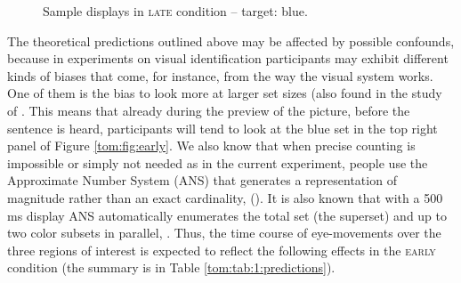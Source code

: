 \documentclass[output=paper]{langscibook}
\begin{document}
\begin{figure} 
\caption{Sample displays in \textsc{late} condition – target: blue.}
    \label{tom:fig:late}
\end{figure}



The theoretical predictions outlined above may be affected by possible confounds, because in experiments on visual
identification participants may exhibit different kinds of biases that come, for instance, from the way the visual
system works. One of them is the bias to look more at larger set sizes (also found in the study of \citet{degen2016availability}. This means that already during the preview of the picture, before the sentence is heard, participants will tend
to look at the blue set in the top right panel of Figure \ref{tom:fig:early}. We also know that when precise counting is impossible or simply not needed as in
the current experiment, people use the Approximate Number System (ANS) that generates a representation of magnitude
rather than an exact cardinality, (\citealt{feigenson2004core, dehaene2009origins, dehaene2011number}). It is also known that with a 500\,ms display
ANS automatically enumerates the total set (the superset) and up to two color subsets in parallel, \citep{halberda2006multiple}. Thus, the time course of eye-movements over the three regions of interest is expected to reflect the following
effects in the \textsc{early} condition (the summary is in Table \ref{tom:tab:1:predictions}).
\end{document}
